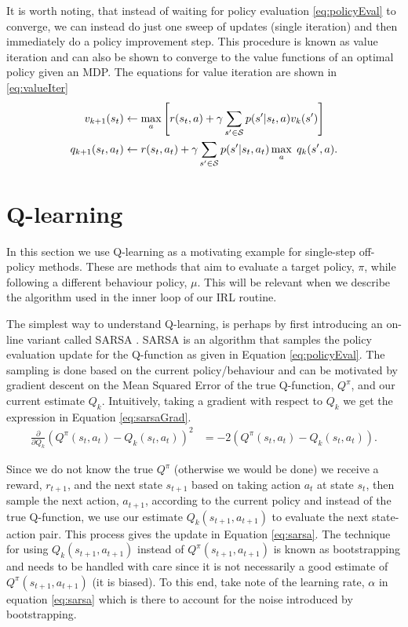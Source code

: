 \documentclass{report}
\numberwithin{equation}{section}
\numberwithin{figure}{section}
\numberwithin{table}{section}
\numberwithin{algorithm}{section}
\begin{document}
It is worth noting, that instead of waiting for policy evaluation 
\ref{eq:policyEval} to converge, we can instead do just one sweep 
of updates (single iteration) and then immediately do a policy 
improvement step. This procedure is known as value iteration and 
can also be shown to converge to the value functions of an 
optimal policy given an MDP. The equations for value iteration 
are shown in \ref{eq:valueIter}
\begin{align}\label{eq:valueIter}
  v_{k+1}(s_t)&\gets\max_a \left[r(s_t, a) 
  + \gamma \sum_{s'\in\mathcal{S}}p(s'|s_t, a)v_{k}(s')\right]\notag\\
  q_{k+1}(s_t, a_t)&\gets r(s_t, a_t) 
  + \gamma \sum_{s'\in\mathcal{S}}p(s'|s_t, a_t)\max_a\; q_{k}(s', a).
\end{align}


\section{Q-learning}
In this section we use Q-learning \citep{QlearningWatkins1992} 
as a motivating example 
for single-step off-policy methods. These are methods 
that aim to evaluate a target policy, $\pi$, while following 
a different behaviour policy, $\mu$. This will be relevant when 
we describe the algorithm \citep{SAC2} 
used in the inner loop of our IRL routine.

The simplest way to understand Q-learning, is perhaps by 
first introducing an on-line variant called SARSA \citep{SARSA}. 
SARSA is an algorithm that samples the policy evaluation update 
for the Q-function as given in Equation \ref{eq:policyEval}.
The sampling is done based on the current policy/behaviour and can 
be motivated by gradient descent on the Mean Squared Error of 
the true Q-function, $Q^{\pi}$, and our current estimate $Q_{k}$.
Intuitively, taking a gradient with respect to $Q_{k}$ we get the 
expression in Equation \ref{eq:sarsaGrad}.
\begin{align}\label{eq:sarsaGrad}
  \frac{\partial}{\partial Q_{k}}(Q^{\pi}(s_t, a_t) - Q_{k}(s_t, a_t))^2&=-2(Q^{\pi}(s_t, a_t) - Q_{k}(s_t,a_t)).
\end{align}

Since we do not know the true $Q^{\pi}$ (otherwise we would be done) 
we receive a reward, $r_{t+1}$, and the next state $s_{t+1}$ 
based on taking action $a_t$ at state $s_t$, then sample the next 
action, $a_{t+1}$, according to the current policy and instead of the 
true Q-function, we use our estimate $Q_{k}(s_{t+1}, a_{t+1})$ to evaluate 
the next state-action pair. This process gives the update in 
Equation \ref{eq:sarsa}.
The technique for using $Q_{k}(s_{t+1}, a_{t+1})$ instead 
of $Q^{\pi}(s_{t+1}, a_{t+1})$ is known as bootstrapping and needs to be 
handled with care since it is not 
necessarily a good estimate of $Q^{\pi}(s_{t+1}, a_{t+1})$ (it is biased). 
To this end, take note of the learning rate, $\alpha$ in equation 
\ref{eq:sarsa} which is there to account for the noise introduced 
by bootstrapping.
\end{document}
